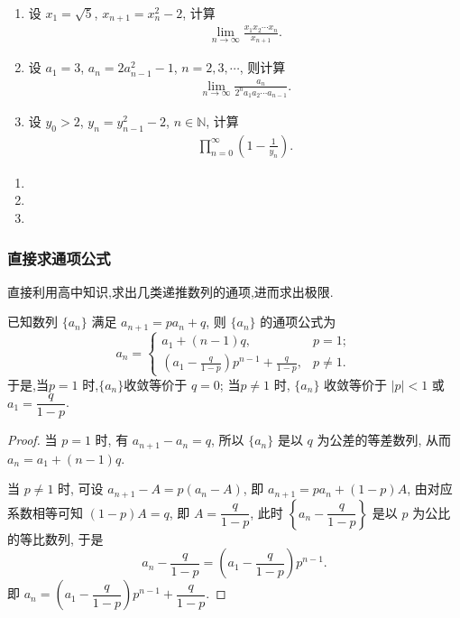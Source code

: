 \documentclass[../../main.tex]{subfiles}
\begin{document}
\begin{example}
\begin{enumerate}
\item 设 $x_1 = \sqrt{5}$, $x_{n+1} = x_n^2 - 2$, 计算
\begin{align*}
\lim_{n \to \infty} \frac{x_1 x_2 \cdots x_n}{x_{n+1}}.
\end{align*}
\item 设 $a_1 = 3$, $a_n = 2a_{n-1}^2 - 1$, $n = 2, 3, \cdots$, 则计算
\begin{align*}
\lim_{n \to \infty} \frac{a_n}{2^n a_1 a_2 \cdots a_{n-1}}.
\end{align*}
\item 设 $y_0 > 2$, $y_n = y_{n-1}^2 - 2$, $n \in \mathbb{N}$, 计算
\begin{align*}
\prod_{n=0}^{\infty} \left(1 - \frac{1}{y_n}\right).
\end{align*}
\end{enumerate}
\end{example}
\begin{solution}
\begin{enumerate}
\item 

\item 

\item 
\end{enumerate}
\end{solution}


\subsubsection{直接求通项公式}

直接利用高中知识,求出几类递推数列的通项,进而求出极限.

\begin{proposition}\label{proposition:可直接求通项--类型一}
已知数列 $\{a_n\}$ 满足 $a_{n+1} = p a_n + q$, 则 $\{a_n\}$ 的通项公式为
\[
a_n = 
\begin{cases} 
a_1 + (n - 1)q, & p = 1; \\
\displaystyle \left( a_1 - \frac{q}{1 - p} \right) p^{n - 1} + \frac{q}{1 - p}, & p \neq 1.
\end{cases}
\]
于是,当$p = 1$ 时,$\{a_n\}$收敛等价于 $q = 0$;
当$p \neq 1$ 时, $\{a_n\}$ 收敛等价于 $|p| < 1$ 或 $a_1 = \dfrac{q}{1 - p}$.
\end{proposition}
\begin{proof}
当 $p = 1$ 时, 有 $a_{n + 1} - a_n = q$, 所以 $\{a_n\}$ 是以 $q$ 为公差的等差数列, 从而 $a_n = a_1 + (n - 1)q$.

当 $p \neq 1$ 时, 可设 $a_{n + 1} - A = p(a_n - A)$, 即 $a_{n + 1} = p a_n + (1 - p)A$, 由对应系数相等可知 $(1 - p)A = q$, 即 $A = \dfrac{q}{1 - p}$, 此时 $\left\{ a_n - \dfrac{q}{1 - p} \right\}$ 是以 $p$ 为公比的等比数列, 于是
\[
a_n - \frac{q}{1 - p} = \left( a_1 - \frac{q}{1 - p} \right) p^{n - 1}.
\]
即 $a_n = \left( a_1 - \dfrac{q}{1 - p} \right) p^{n - 1} + \dfrac{q}{1 - p}$. 
\end{proof}
\end{document}

